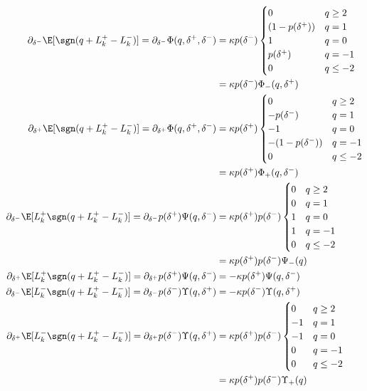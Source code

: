 \documentclass[12pt]{article}
\begin{document}
\begin{align}
\partial_{\delta^-} \E [\sgn(q + L_k^+ - L_k^-)] = \partial_{\delta^-} \Phi(q, \delta^+, \delta^-) & = \kappa p(\delta^-) \begin{cases} 
0 & q \geq 2 \\
(1-p(\delta^+)) & q = 1 \\
1 & q = 0 \\
p(\delta^+)  & q = -1 \\
0 & q \leq -2
\end{cases} \\
& = \kappa p(\delta^-) \Phi_-(q,\delta^+) \\
\partial_{\delta^+} \E [\sgn(q + L_k^+ - L_k^-)] =\partial_{\delta^+} \Phi(q, \delta^+, \delta^-) & =  \kappa p(\delta^+) \begin{cases} 
0 & q \geq 2 \\
- p(\delta^-) & q = 1 \\
- 1 & q = 0 \\
- (1 - p(\delta^-)) & q = -1 \\
0 & q \leq -2
\end{cases} \\
& = \kappa p(\delta^+)\Phi_+(q,\delta^-) \\
\partial_{\delta^-} \E [L_k^+ \sgn(q + L_k^+ - L_k^-)] = \partial_{\delta^-} p(\delta^+) \Psi(q, \delta^-) & = \kappa p(\delta^+) p(\delta^-)\begin{cases} 
0 & q \geq 2 \\
0 & q = 1 \\
1 & q = 0 \\
1 & q = -1 \\
0 & q \leq -2
\end{cases} \\
& = \kappa p(\delta^+) p(\delta^-) \Psi_-(q) \\
\partial_{\delta^+} \E [L_k^+ \sgn(q + L_k^+ - L_k^-)] = \partial_{\delta^+} p(\delta^+) \Psi(q, \delta^-) & = -\kappa p(\delta^+) \Psi(q, \delta^-)
 \\
\partial_{\delta^-} \E [L_k^- \sgn(q + L_k^+ - L_k^-)] = \partial_{\delta^-} p(\delta^-) \Upsilon(q, \delta^+) & = -\kappa p(\delta^-) \Upsilon(q, \delta^+)
 \\
 \partial_{\delta^+} \E [L_k^- \sgn(q + L_k^+ - L_k^-)] = \partial_{\delta^+} p(\delta^-) \Upsilon(q, \delta^+)& = \kappa p(\delta^+) p(\delta^-) \begin{cases} 
0 & q \geq 2 \\
-1 & q = 1 \\
-1 & q = 0 \\
0 & q = -1 \\
0 & q \leq -2
\end{cases} \\
& = \kappa p(\delta^+) p(\delta^-)\Upsilon_+(q)
\end{align}
\end{document}
